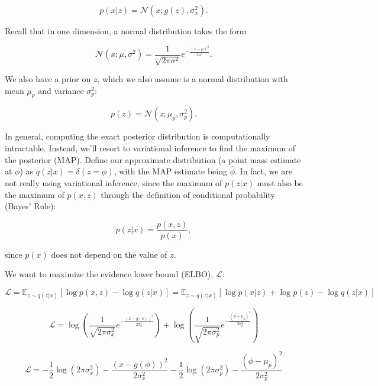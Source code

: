 \begin{equation}
	p (x | z) = \mathcal{N} (x; g(z), \sigma^2_x).
\end{equation}

\noindent Recall that in one dimension, a normal distribution takes the form

\begin{equation}
	\mathcal{N} (x; \mu, \sigma^2) = \frac{1}{\sqrt{2 \pi \sigma^2}} e^{-\frac{(x - \mu)^2}{2 \sigma^2}}.
\end{equation}

\noindent We also have a prior on $z$, which we also assume is a normal distribution with mean $\mu_p$ and variance $\sigma^2_p$:

\begin{equation}
	p (z) = \mathcal{N} (z; \mu_p, \sigma^2_p).
\end{equation}

In general, computing the exact posterior distribution is computationally intractable. Instead, we'll resort to variational inference to find the maximum of the posterior (MAP). Define our approximate distribution (a point mass estimate at $\phi$) as $q(z|x) = \delta (z = \phi)$, with the MAP estimate being $\hat{\phi}$. In fact, we are not really using variational inference, since the maximum of $p(z | x)$ must also be the maximum of $p(x, z)$ through the definition of conditional probability (Bayes' Rule):

\begin{equation}
p(z|x) = \frac{p(x, z)}{p(x)},
\end{equation}

\noindent since $p(x)$ does not depend on the value of $z$.

We want to maximize the evidence lower bound (ELBO), $\mathcal{L}$:

\begin{equation}
	\mathcal{L} = \mathbb{E}_{z \sim q(z|x)} \left[ \log p(x, z) - \log q(z|x) \right] = \mathbb{E}_{z \sim q(z|x)} \left[ \log p(x|z) + \log p(z) - \log q(z|x) \right] 
\end{equation}

\begin{equation}
	\mathcal{L} = \log \left( \frac{1}{\sqrt{2 \pi \sigma_x^2}} e^{-\frac{(x - g(\phi))^2}{2 \sigma_x^2}} \right) + \log \left( \frac{1}{\sqrt{2 \pi \sigma_p^2}} e^{-\frac{(\phi - \mu_p)^2}{2 \sigma_p^2}} \right)
\end{equation}

\begin{equation}
	\mathcal{L} = -\frac{1}{2} \log ( 2 \pi \sigma_x^2 )  - \frac{(x - g(\phi))^2}{2 \sigma_x^2} - \frac{1}{2} \log ( 2 \pi \sigma_p^2 ) -\frac{(\phi - \mu_p)^2}{2 \sigma_p^2}
\end{equation}

